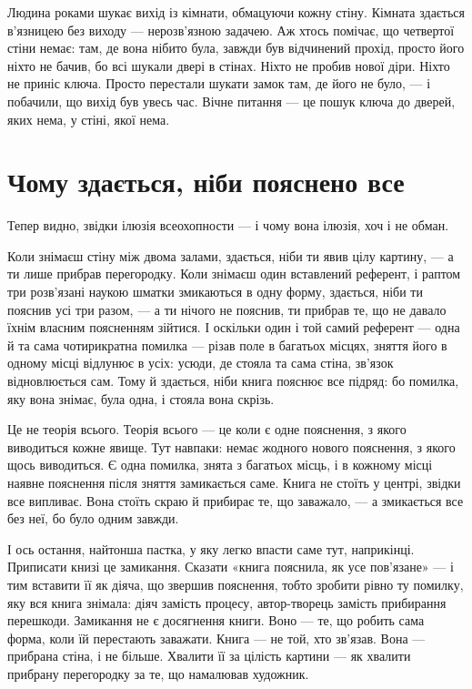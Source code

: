 \documentclass[12pt, a4paper, openany]{book}
\begin{document}
\begin{analogybox}
Людина роками шукає вихід із кімнати, обмацуючи кожну стіну. Кімната здається в'язницею без виходу --- нерозв'язною задачею. Аж хтось помічає, що четвертої стіни немає: там, де вона нібито була, завжди був відчинений прохід, просто його ніхто не бачив, бо всі шукали двері в стінах. Ніхто не пробив нової діри. Ніхто не приніс ключа. Просто перестали шукати замок там, де його не було, --- і побачили, що вихід був увесь час. Вічне питання --- це пошук ключа до дверей, яких нема, у стіні, якої нема.
\end{analogybox}

\section{Чому здається, ніби пояснено все}

Тепер видно, звідки ілюзія всеохопности --- і чому вона ілюзія, хоч і не обман.

Коли знімаєш стіну між двома залами, здається, ніби ти явив цілу картину, --- а ти лише прибрав перегородку. Коли знімаєш один вставлений референт, і раптом три розв'язані наукою шматки змикаються в одну форму, здається, ніби ти пояснив усі три разом, --- а ти нічого не пояснив, ти прибрав те, що не давало їхнім власним поясненням зійтися. І оскільки один і той самий референт --- одна й та сама чотирикратна помилка --- різав поле в багатьох місцях, зняття його в одному місці відлунює в усіх: усюди, де стояла та сама стіна, зв'язок відновлюється сам. Тому й здається, ніби книга пояснює все підряд: бо помилка, яку вона знімає, була одна, і стояла вона скрізь.

Це не теорія всього. Теорія всього --- це коли є одне пояснення, з якого виводиться кожне явище. Тут навпаки: немає жодного нового пояснення, з якого щось виводиться. Є одна помилка, знята з багатьох місць, і в кожному місці наявне пояснення після зняття замикається саме. Книга не стоїть у центрі, звідки все випливає. Вона стоїть скраю й прибирає те, що заважало, --- а змикається все без неї, бо було одним завжди.

І ось остання, найтонша пастка, у яку легко впасти саме тут, наприкінці. Приписати книзі це замикання. Сказати «книга пояснила, як усе пов'язане» --- і тим вставити її як діяча, що звершив пояснення, тобто зробити рівно ту помилку, яку вся книга знімала: діяч замість процесу, автор-творець замість прибирання перешкоди. Замикання не є досягнення книги. Воно --- те, що робить сама форма, коли їй перестають заважати. Книга --- не той, хто зв'язав. Вона --- прибрана стіна, і не більше. Хвалити її за цілість картини --- як хвалити прибрану перегородку за те, що намалював художник.
\end{document}
